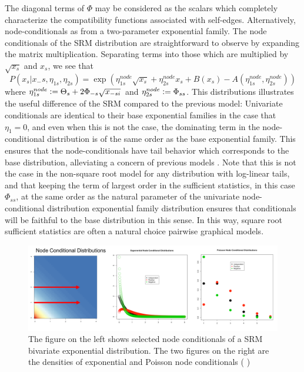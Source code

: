 \documentclass{samkoelleprelimworking}
\newcommand{\vmadd}[1]{\textbf{\color{red}{#1}}}
\newcommand{\vmcomment}[1]{({\color{blue}{VM's comment:}} \textbf{\color{blue}{#1}})}
\begin{document}
The diagonal terms of $\Phi$ may be considered as the scalars which completely characterize the compatibility functions associated with self-edges. Alternatively, node-conditionals as from a two-parameter exponential family.    The node conditionals of the SRM distribution are straightforward to observe by expanding the matrix multiplication. Separating terms into those which are multiplied by $\sqrt{x_s}$ and $x_s$, we see that
\[P(x_s \vert x_-s, \eta_{1s}, \eta_{2s}) = \exp{(\eta_{1s}^{node} \sqrt{x_s} + \eta_{2s}^{node} x_s + B(x_s) - A(\eta_{1s}^{node} , \eta_{2s}^{node} ))} \]
where $\eta_{1s}^{node} \vcentcolon = \Theta_s + 2 \Phi_{-s}\sqrt{x_{-si}}$ and $\eta_{2s}^{node} \vcentcolon = \Phi_{ss}$.  This distributions illustrates the useful difference of the SRM compared to the previous model:   Univariate conditionals are identical to their base exponential families in the case that $\eta_1 = 0$, and even when this is not the case, the dominating term in the node-conditional distribution is of the same order as the base exponential family.  This ensures that the node-conditionals have tail behavior which corresponds to the base distribution, alleviating a concern of previous models \citep{Yang2013-is}. Note that this is not the case in the non-square root model for any distribution with log-linear tails, and that keeping the term of largest order in the sufficient statistics, in this case $\Phi_{ss}$, at the same order as the natural parameter of the univariate node-conditional distribution exponential family distribution ensures that conditionals will be faithful to the base distribution in this sense.  In this way, square root sufficient statistics are often a natural choice pairwise graphical models.

\begin{figure}\label{fig:conditionals}
\includegraphics[width=\textwidth]{fig2condish}
\caption{The figure on the left shows selected node conditionals of a SRM bivariate exponential distribution.  The two figures on the right are the densities of exponential and Poisson node conditionals\vmadd{.} 
\vmcomment{Fonts in the plots are too small.}}
\end{figure}
\end{document}
